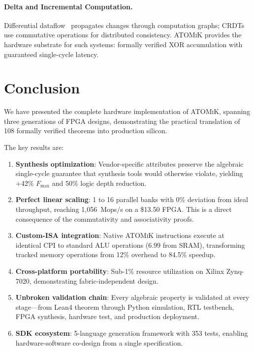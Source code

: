 \documentclass[11pt,letterpaper]{article}
\theoremstyle{plain}
\theoremstyle{definition}
\theoremstyle{remark}
\newcommand{\atomik}{\textsc{ATOMiK}}
\newcommand{\fmax}{$F_{\max}$}
\begin{document}
\paragraph{Delta and Incremental Computation.}
Differential dataflow~\cite{mcsherry2013differential} propagates changes through computation graphs; CRDTs~\cite{shapiro2011conflict} use commutative operations for distributed consistency. \atomik{} provides the hardware substrate for such systems: formally verified XOR accumulation with guaranteed single-cycle latency.

\section{Conclusion}
\label{sec:conclusion}

We have presented the complete hardware implementation of \atomik{}, spanning three generations of FPGA designs, demonstrating the practical translation of 108 formally verified theorems into production silicon.

The key results are:

\begin{enumerate}
    \item \textbf{Synthesis optimization}: Vendor-specific attributes preserve the algebraic single-cycle guarantee that synthesis tools would otherwise violate, yielding +42\% \fmax{} and 50\% logic depth reduction.

    \item \textbf{Perfect linear scaling}: 1 to 16 parallel banks with 0\% deviation from ideal throughput, reaching 1,056~Mops/s on a \$13.50 FPGA. This is a direct consequence of the commutativity and associativity proofs.

    \item \textbf{Custom-ISA integration}: Native \atomik{} instructions execute at identical CPI to standard ALU operations (6.99 from SRAM), transforming tracked memory operations from 12\% overhead to 84.5\% speedup.

    \item \textbf{Cross-platform portability}: Sub-1\% resource utilization on Xilinx Zynq-7020, demonstrating fabric-independent design.

    \item \textbf{Unbroken validation chain}: Every algebraic property is validated at every stage---from Lean4 theorem through Python simulation, RTL testbench, FPGA synthesis, hardware test, and production deployment.

    \item \textbf{SDK ecosystem}: 5-language generation framework with 353 tests, enabling hardware-software co-design from a single specification.
\end{enumerate}
\end{document}
